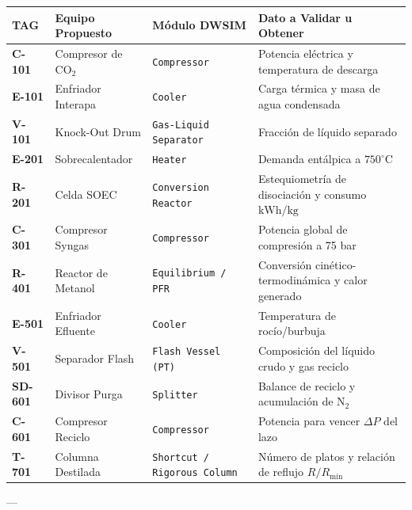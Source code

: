 \documentclass[11pt,letterpaper]{article}
\begin{document}
\begin{table}[h!]
    \centering
    \small
    \begin{tabularx}{\textwidth}{|l|X|l|X|}
        \hline
        \rowcolor{SolvantaNavy}
        \textbf{\color{white}TAG} & \textbf{\color{white}Equipo Propuesto} & \textbf{\color{white}Módulo DWSIM} & \textbf{\color{white}Dato a Validar u Obtener} \\
        \hline
        \textbf{C-101} & Compresor de $\text{CO}_2$ & \texttt{Compressor} & Potencia eléctrica y temperatura de descarga \\ \hline
        \textbf{E-101} & Enfriador Interapa & \texttt{Cooler} & Carga térmica y masa de agua condensada \\ \hline
        \textbf{V-101} & Knock-Out Drum & \texttt{Gas-Liquid Separator} & Fracción de líquido separado \\ \hline
        \textbf{E-201} & Sobrecalentador & \texttt{Heater} & Demanda entálpica a $750^\circ\text{C}$ \\ \hline
        \textbf{R-201} & Celda SOEC & \texttt{Conversion Reactor} & Estequiometría de disociación y consumo $\text{kWh/kg}$ \\ \hline
        \textbf{C-301} & Compresor Syngas & \texttt{Compressor} & Potencia global de compresión a 75 bar \\ \hline
        \textbf{R-401} & Reactor de Metanol & \texttt{Equilibrium / PFR} & Conversión cinético-termodinámica y calor generado \\ \hline
        \textbf{E-501} & Enfriador Efluente & \texttt{Cooler} & Temperatura de rocío/burbuja \\ \hline
        \textbf{V-501} & Separador Flash & \texttt{Flash Vessel (PT)} & Composición del líquido crudo y gas reciclo \\ \hline
        \textbf{SD-601} & Divisor Purga & \texttt{Splitter} & Balance de reciclo y acumulación de $\text{N}_2$ \\ \hline
        \textbf{C-601} & Compresor Reciclo & \texttt{Compressor} & Potencia para vencer $\Delta P$ del lazo \\ \hline
        \textbf{T-701} & Columna Destilada & \texttt{Shortcut / Rigorous Column} & Número de platos y relación de reflujo $R/R_{\min}$ \\ \hline
    \end{tabularx}
\end{table}

---

\end{document}

